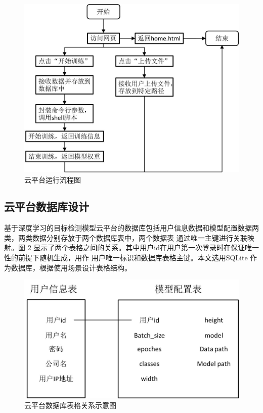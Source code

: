 \begin{figure}
    \centering
    \includegraphics[width=\textwidth]{pic/chap4/cloudplatform_process.jpg}
    \caption{云平台运行流程图}
    \label{fig:cloudplatform_process}
\end{figure}

\subsection{云平台数据库设计}

基于深度学习的目标检测模型云平台的数据库包括用户信息数据和模型配置数据两类，两类数据分别存放于两个数据库表中，两个数据表
通过唯一主键进行关联映射。图 \ref{fig:database_table} 显示了两个表格之间的关系。其中用户id在用户第一次登录时在保证唯一性的前提下随机生成，用作
用户唯一标识和数据库表格主键。本文选用SQLite \cite{SQLite} 作为数据库，根据使用场景设计表格结构。

\begin{figure}
    \centering
    \includegraphics[width=\textwidth]{pic/chap4/database_table.jpg}
    \caption{云平台数据库表格关系示意图}
    \label{fig:database_table}
\end{figure}

